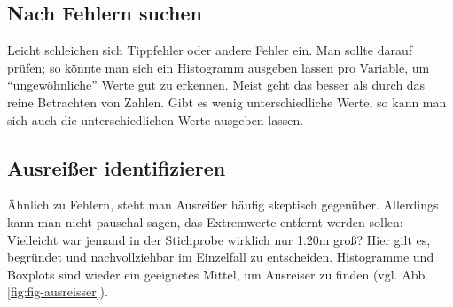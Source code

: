 \documentclass[12pt,ngerman,]{book}
\makeatletter
\newenvironment{Shaded}{\begin{snugshade}}{\end{snugshade}}
\newcommand{\KeywordTok}[1]{\textcolor[rgb]{0.13,0.29,0.53}{\textbf{{#1}}}}
\newcommand{\DataTypeTok}[1]{\textcolor[rgb]{0.13,0.29,0.53}{{#1}}}
\newcommand{\DecValTok}[1]{\textcolor[rgb]{0.00,0.00,0.81}{{#1}}}
\newcommand{\StringTok}[1]{\textcolor[rgb]{0.31,0.60,0.02}{{#1}}}
\newcommand{\CommentTok}[1]{\textcolor[rgb]{0.56,0.35,0.01}{\textit{{#1}}}}
\newcommand{\NormalTok}[1]{{#1}}
\newenvironment{kframe}{%
\medskip{}
\setlength{\fboxsep}{.8em}
 \def\at@end@of@kframe{}%
 \ifinner\ifhmode%
  \def\at@end@of@kframe{\end{minipage}}%
  \begin{minipage}{\columnwidth}%
 \fi\fi%
 \def\FrameCommand##1{\hskip\@totalleftmargin \hskip-\fboxsep
 \colorbox{shadecolor}{##1}\hskip-\fboxsep
     \hskip-\linewidth \hskip-\@totalleftmargin \hskip\columnwidth}%
 \MakeFramed {\advance\hsize-\width
   \@totalleftmargin\z@ \linewidth\hsize
   \@setminipage}}%
 {\par\unskip\endMakeFramed%
 \at@end@of@kframe}
\renewenvironment{Shaded}{\begin{kframe}}{\end{kframe}}
\makeatother
\begin{document}
\subsection{Nach Fehlern suchen}\label{nach-fehlern-suchen}

Leicht schleichen sich Tippfehler oder andere Fehler ein. Man sollte
darauf prüfen; so könnte man sich ein Histogramm ausgeben lassen pro
Variable, um ``ungewöhnliche'' Werte gut zu erkennen. Meist geht das
besser als durch das reine Betrachten von Zahlen. Gibt es wenig
unterschiedliche Werte, so kann man sich auch die unterschiedlichen
Werte ausgeben lassen.

\begin{Shaded}
\end{Shaded}

\subsection{Ausreißer identifizieren}\label{ausreier-identifizieren}

Ähnlich zu Fehlern, steht man Ausreißer häufig skeptisch gegenüber.
Allerdings kann man nicht pauschal sagen, das Extremwerte entfernt
werden sollen: Vielleicht war jemand in der Stichprobe wirklich nur
1.20m groß? Hier gilt es, begründet und nachvollziehbar im Einzelfall zu
entscheiden. Histogramme und Boxplots sind wieder ein geeignetes Mittel,
um Ausreiser zu finden (vgl. Abb. \ref{fig:fig-ausreisser}).

\begin{Shaded}
\end{Shaded}
\end{document}
